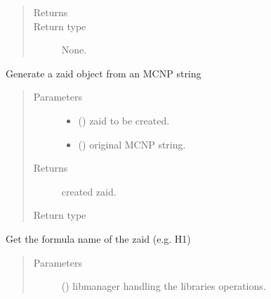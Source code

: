 \documentclass[letterpaper,10pt,english]{sphinxmanual}
\begin{document}
\begin{fulllineitems}
\begin{quote}
\begin{description}
\item[{Returns}] \leavevmode


\item[{Return type}] \leavevmode
None.

\end{description}\end{quote}

\begin{fulllineitems}
\label{\detokenize{api/inputgeneration:matreader.Zaid.from_string}}
Generate a zaid object from an MCNP string
\begin{quote}\begin{description}
\item[{Parameters}] \leavevmode\begin{itemize}
\item {} 
 ({\hyperref[\detokenize{api/inputgeneration:matreader.Zaid}]{}}) \textendash{} zaid to be created.

\item {} 
 () \textendash{} original MCNP string.

\end{itemize}

\item[{Returns}] \leavevmode
created zaid.

\item[{Return type}] \leavevmode
{\hyperref[\detokenize{api/inputgeneration:matreader.Zaid}]{}}

\end{description}\end{quote}

\end{fulllineitems}


\begin{fulllineitems}
\label{\detokenize{api/inputgeneration:matreader.Zaid.get_fullname}}
Get the formula name of the zaid (e.g. H1)
\begin{quote}\begin{description}
\item[{Parameters}] \leavevmode
{} ({\hyperref[\detokenize{api/initobjects:libmanager.LibManager}]{}}) \textendash{} libmanager handling the libraries operations.


\end{description}
\end{quote}
\end{fulllineitems}
\end{fulllineitems}
\end{document}
